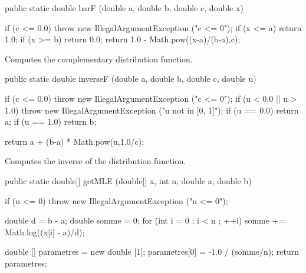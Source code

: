 \begin{htmlonly}
\end{htmlonly}
\begin{code}

   public static double barF (double a, double b, double c, double x)\begin{hide} {
      if (c <= 0.0)
         throw new IllegalArgumentException ("c <= 0");
      if (x <= a)
         return 1.0;
      if (x >= b)
         return 0.0;
      return 1.0 - Math.pow((x-a)/(b-a),c);
   }\end{hide}
\end{code}
  \begin{tabb}
 Computes  the complementary distribution function.
 \end{tabb}
\begin{htmlonly}
\end{htmlonly}
\begin{code}

   public static double inverseF (double a, double b, double c, double u)\begin{hide} {
      if (c <= 0.0)
         throw new IllegalArgumentException ("c <= 0");
      if (u < 0.0 || u > 1.0)
          throw new IllegalArgumentException ("u not in [0, 1]");
      if (u == 0.0)
         return a;
      if (u == 1.0)
         return b;

      return a + (b-a) * Math.pow(u,1.0/c);
   }\end{hide}
\end{code}
  \begin{tabb}
  Computes  the inverse of the distribution function.
 \end{tabb}
\begin{htmlonly}
\end{htmlonly}
\begin{code}

   public static double[] getMLE (double[] x, int n, double a, double b)\begin{hide} {
      if (n <= 0)
         throw new IllegalArgumentException ("n <= 0");

      double d = b - a;
      double somme = 0;
      for (int i = 0 ; i < n ; ++i) somme += Math.log((x[i] - a)/d);

      double [] parametres = new double [1];
      parametres[0] = -1.0 / (somme/n);
      return parametres;
   }\end{hide}
\end{code}
